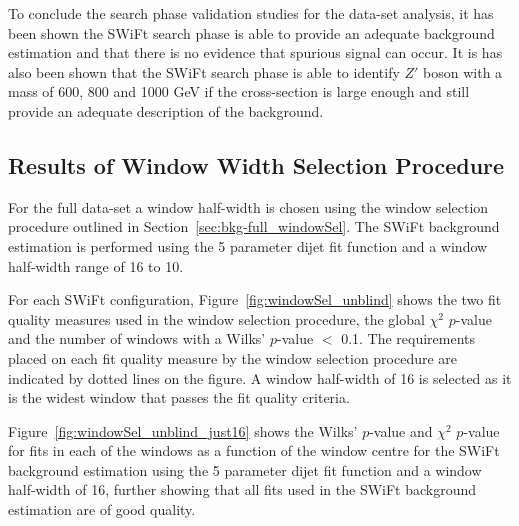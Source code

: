 To conclude the search phase validation studies for the \lm{} data-set analysis,
it has been shown the SWiFt search phase is
able to provide an adequate background estimation 
and that there is no evidence that spurious signal can occur.
It is has also been shown that 
the SWiFt search phase is able to identify
$Z'$ boson with a mass of 600, 800 and 1000 GeV if the cross-section is large enough
and still provide an adequate description of the background.

\subsection{Results of Window Width Selection Procedure}
\label{sec:bkg-full_windowSelResults}

For the full \lm{} data-set a window half-width is chosen using the window selection procedure outlined in Section~\ref{sec:bkg-full_windowSel}.
The SWiFt background estimation is performed using the 5 parameter dijet fit function and a window half-width range of 16 to 10.

For each SWiFt configuration, Figure~\ref{fig:windowSel_unblind} shows the two fit quality measures used in the window selection procedure,
the global $\chi^2$ $p$-value and the number of windows with a Wilks' $p$-value $<$ 0.1.
The requirements placed on each fit quality measure by the window selection procedure are indicated by dotted lines on the figure.
A window half-width of 16 is selected as it is the widest window that passes the fit quality criteria.

Figure~\ref{fig:windowSel_unblind_just16} shows the Wilks' $p$-value and $\chi^2$ $p$-value for fits in each of the windows
as a function of the window centre for the SWiFt background estimation using the 5 parameter dijet fit function and a window half-width of 16,
further showing that all fits used in the SWiFt background estimation are of good quality.

